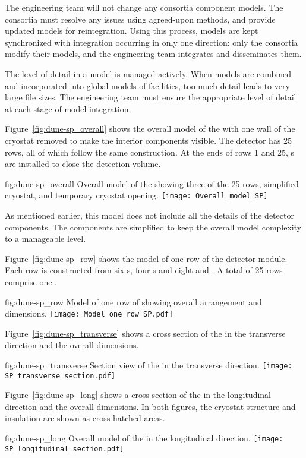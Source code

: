 The  engineering team will not change any consortia
component models.  The consortia must resolve any issues using agreed-upon methods, and provide updated models for reintegration. Using this
process, models are kept synchronized with integration occurring in
only one direction: only the consortia modify their models, and the
 engineering team integrates and disseminates them.


The level of detail in a model is managed actively. When models are combined and 
incorporated into global models of facilities, too much
detail leads to very large file sizes.  The 
engineering team must ensure the appropriate level of detail at each
stage of model integration.


Figure~\ref{fig:dune-sp_overall} shows the overall model of the
 with one wall of the cryostat  removed to make the
interior components visible. The detector has 25 rows, all of
which follow the same construction. At the ends of rows 1 and 25,
\endwall{}s are installed to close the detection volume.
\begin{dunefigure}{fig:dune-sp_overall}
  {Overall model of the  showing three of the 25 rows,
    simplified cryostat,  and temporary cryostat opening.}
  \texttt{[image: Overall\_model\_SP]}
\end{dunefigure}
As mentioned earlier, this model does not include all the details of
the detector components. The components are simplified to keep the
overall model complexity to a manageable level.


Figure~\ref{fig:dune-sp_row} shows the model of one row of the
detector module. Each row is constructed from six s, four
s and eight  and . A total of 25 rows
comprise one .
\begin{dunefigure}{fig:dune-sp_row}
  {Model of one row of  showing overall arrangement and dimensions.}
  \texttt{[image: Model\_one\_row\_SP.pdf]}
\end{dunefigure}


Figure~\ref{fig:dune-sp_transverse} shows a cross section of the
 in the transverse direction and the overall
dimensions.
\begin{dunefigure}{fig:dune-sp_transverse}
  {Section view of the  in the transverse
    direction.}
  \texttt{[image: SP\_transverse\_section.pdf]}
\end{dunefigure}
Figure~\ref{fig:dune-sp_long} shows a cross section of the
 in the longitudinal direction and the overall
dimensions. In both figures, the cryostat structure and insulation are shown
as cross-hatched areas.
\begin{dunefigure}{fig:dune-sp_long}
  {Overall model of the  in the longitudinal direction.}
  \texttt{[image: SP\_longitudinal\_section.pdf]}
\end{dunefigure}



